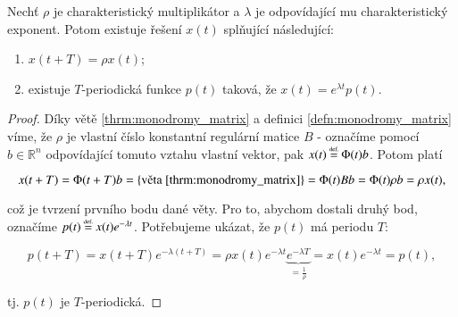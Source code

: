 \begin{thrm}\label{thrm:solution_properties}
	Nechť $\rho$ je charakteristický multiplikátor a $\lambda$ je odpovídající mu charakteristický exponent. Potom existuje řešení $x(t)$ splňující následující:
	
	\begin{enumerate}
		\item $x(t+T) = \rho x(t)$;
		\item existuje $T$-periodická funkce $p(t)$ taková, že $x(t) = e^{ \lambda t } p(t)$.
	\end{enumerate} 

	\begin{proof}
		Díky větě \ref{thrm:monodromy_matrix} a definici \ref{defn:monodromy_matrix} víme, že $\rho$ je vlastní číslo konstantní regulární matice $B$ - označíme pomocí $b \in \mathbb{R}^{n}$ odpovídající tomuto vztahu vlastní vektor, pak $x(t) \defeq \Phi(t)b$. Potom platí
		
		\begin{equation}
			x(t+T) = \Phi(t+T) b = \{ \text{věta \ref{thrm:monodromy_matrix}} \} = \Phi(t) B b = \Phi(t) \rho b = \rho x(t), 
		\end{equation}
		
		\noindent
		což je tvrzení prvního bodu dané věty. Pro to, abychom dostali druhý bod, označíme $p(t) \defeq x(t) e^{ - \lambda t }$. Potřebujeme ukázat, že $p(t)$ má periodu $T$:
		
		\begin{equation}
			p(t+T) = x(t+T) e^{ - \lambda (t+T) } = \rho x(t) e^{ - \lambda t } \underbrace{e^{- \lambda T}}_{ = \tfrac{1}{\rho} } = x(t) e^{ - \lambda t } = p(t),
		\end{equation}
		
		\noindent
		tj. $p(t)$ je $T$-periodická.
	\end{proof}
\end{thrm}

